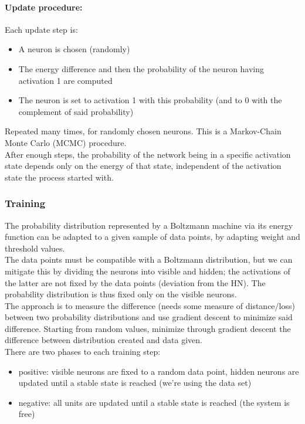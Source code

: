 \paragraph{Update procedure:} Each update step is:
\begin{itemize}
	\item A neuron is chosen (randomly)
	\item The energy difference and then the probability of the neuron having activation 1 are computed
	\item The neuron is set to activation 1 with this probability (and to 0 with the complement of said probability)
\end{itemize}
Repeated many times, for randomly chosen neurons. This is a Markov-Chain Monte Carlo (MCMC) procedure.\\

After enough steps, the probability of the network being in a specific activation state depends only on the energy of that state, independent of the activation state the process started with.\\

\subsubsection{Training}
The probability distribution represented by a Boltzmann machine via its energy function can be adapted to a given sample of data points, by adapting weight and threshold values.\\
The data points must be compatible with a Boltzmann distribution, but we can mitigate this by dividing the neurons into visible and hidden; the activations of the latter are not fixed by the data points (deviation from the HN). The probability distribution is thus fixed only on the visible neurons.\\

The approach is to measure the difference (needs some measure of distance/loss) between two probability distributions and use gradient descent to minimize said difference. Starting from random values, minimize through gradient descent the difference between distribution created and data given.\\

There are two phases to each training step: 
\begin{itemize}
	\item positive: visible neurons are fixed to a random data point, hidden neurons are updated until a stable state is reached (we're using the data set)
	\item negative: all units are updated until a stable state is reached (the system is free)
\end{itemize}

